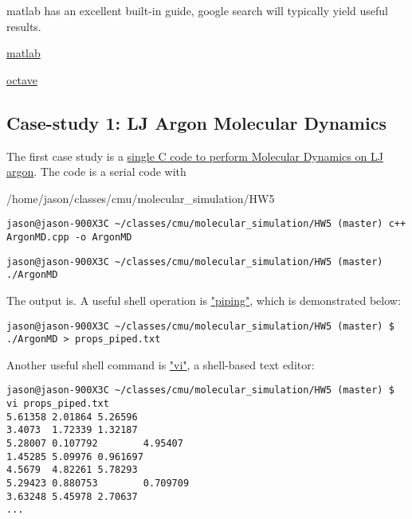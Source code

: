 matlab has an excellent built-in guide, google search will typically 
yield useful results. 

\href{http://www.gnu.org/software/octave/}
{matlab}

\href{http://www.gnu.org/software/octave/}
{octave}



\subsection{Case-study 1: LJ Argon Molecular Dynamics}

The first case study is a 
\href{https://github.com/jasonlarkin/classes/tree/master/cmu/molecular_simulation/HW5}
{single C code to perform Molecular Dynamics 
on LJ argon}. The code is a serial code with 

/home/jason/classes/cmu/molecular_simulation/HW5

\lstset{language=Shell}
\begin{lstlisting}[label=some-code,caption=Some Code]
jason@jason-900X3C ~/classes/cmu/molecular_simulation/HW5 (master) c++ ArgonMD.cpp -o ArgonMD
\end{lstlisting}

\lstset{language=Shell}
\begin{lstlisting}[label=some-code,caption=Some Code]
jason@jason-900X3C ~/classes/cmu/molecular_simulation/HW5 (master) ./ArgonMD
\end{lstlisting}

The output is.  A useful shell operation is 
\href{http://www.linfo.org/pipes.html}{"piping"}, which is demonstrated below:

\lstset{language=Shell}
\begin{lstlisting}[label=some-code,caption=Some Code]
jason@jason-900X3C ~/classes/cmu/molecular_simulation/HW5 (master) $ ./ArgonMD > props_piped.txt
\end{lstlisting}

Another useful shell command is 
\href{http://www.tuxfiles.org/linuxhelp/vimcheat.html}{"vi"}, a 
shell-based text editor:
\lstset{language=Shell}
\begin{lstlisting}[label=some-code,caption=Some Code]
jason@jason-900X3C ~/classes/cmu/molecular_simulation/HW5 (master) $ vi props_piped.txt
5.61358 2.01864 5.26596
3.4073  1.72339 1.32187
5.28007 0.107792        4.95407
1.45285 5.09976 0.961697
4.5679  4.82261 5.78293
5.29423 0.880753        0.709709
3.63248 5.45978 2.70637
...
\end{lstlisting}

